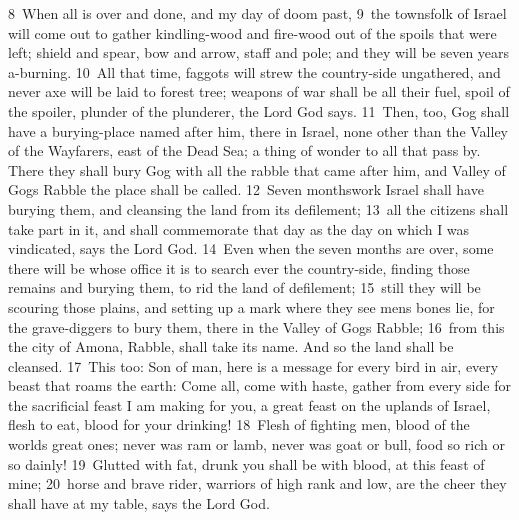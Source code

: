 \documentclass[10pt]{book} %
\begin{document}
\textcolor{benred8}{8}~When all is over and done, and my day of doom past, \textcolor{benred8}{9}~the townsfolk of Israel will come out to gather kindling-wood and fire-wood out of the spoils that were left; shield and spear, bow and arrow, staff and pole; and they will be seven years a-burning. \textcolor{benred8}{10}~All that time, faggots will strew the country-side ungathered, and never axe will be laid to forest tree; weapons of war shall be all their fuel, spoil of the spoiler, plunder of the plunderer, the Lord God says. \textcolor{benred8}{11}~Then, too, Gog shall have a burying-place named after him, there in Israel, none other than the Valley of the Wayfarers, east of the Dead Sea; a thing of wonder to all that pass by. There they shall bury Gog with all the rabble that came after him, and Valley of Gog\textquotesingle s Rabble the place shall be called. \textcolor{benred8}{12}~Seven months\textquotesingle  work Israel shall have burying them, and cleansing the land from its defilement; \textcolor{benred8}{13}~all the citizens shall take part in it, and shall commemorate that day as the day on which I was vindicated, says the Lord God. \textcolor{benred8}{14}~Even when the seven months are over, some there will be whose office it is to search ever the country-side, finding those remains and burying them, to rid the land of defilement; \textcolor{benred8}{15}~still they will be scouring those plains, and setting up a mark where they see men\textquotesingle s bones lie, for the grave-diggers to bury them, there in the Valley of Gog\textquotesingle s Rabble; \textcolor{benred8}{16}~from this the city of Amona, Rabble, shall take its name. And so the land shall be cleansed.
\textcolor{benred8}{17}~This too: Son of man, here is a message for every bird in air, every beast that roams the earth: Come all, come with haste, gather from every side for the sacrificial feast I am making for you, a great feast on the uplands of Israel, flesh to eat, blood for your drinking! \textcolor{benred8}{18}~Flesh of fighting men, blood of the world\textquotesingle s great ones; never was ram or lamb, never was goat or bull, food so rich or so dainly! \textcolor{benred8}{19}~Glutted with fat, drunk you shall be with blood, at this feast of mine; \textcolor{benred8}{20}~horse and brave rider, warriors of high rank and low, are the cheer they shall have at my table, says the Lord God.
\end{document}
